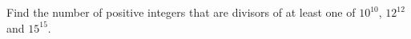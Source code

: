 Find the number of positive integers that are divisors of at least one of $10^{10}$, $12^{12}$ and $15^{15}$.
